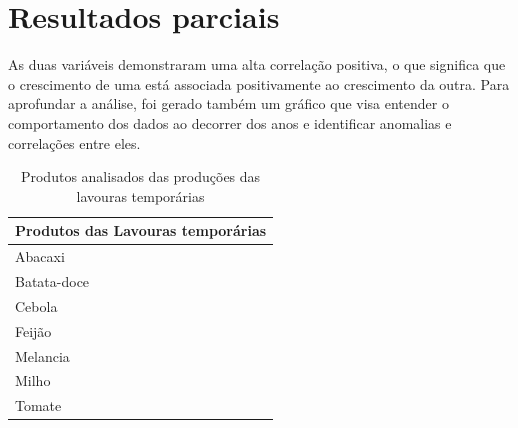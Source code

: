 
\section{Resultados parciais}



As duas variáveis demonstraram uma alta correlação positiva, o que significa que o crescimento de uma está associada positivamente ao crescimento da outra. Para aprofundar a análise, foi gerado também um gráfico que visa entender o comportamento dos dados ao decorrer dos anos e identificar anomalias e correlações entre eles.
\begin{center}
    \begin{table}[!htb]
        \centering
        \begin{tabular}{p{}}
        \hline
        \textbf{Produtos das Lavouras temporárias} \\ \hline
           \hspace{0.3cm} Abacaxi \\ 
            \hline
           \hspace{0.3cm} Batata-doce \\ 
            \hline
           \hspace{0.3cm} Cebola \\ 
            \hline
           \hspace{0.3cm} Feijão \\
            \hline
           \hspace{0.3cm} Melancia \\
            \hline
           \hspace{0.3cm} Milho \\
            \hline
           \hspace{0.3cm} Tomate \\
            \hline  
            \end{tabular}
        \caption{Produtos analisados das produções das lavouras temporárias}
        \label{tab:produto_analisados-lavtemp}
    \end{table}
\end{center}


